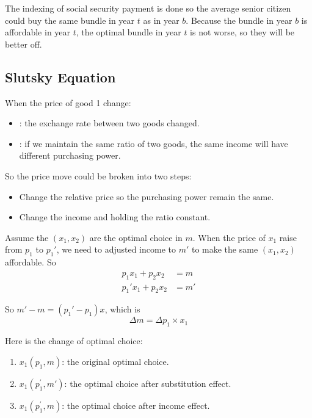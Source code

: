 \begin{example}
    The indexing of social security payment is done so the average senior citizen could buy the same bundle in year $t$ as in year $b$. Because the bundle in year $b$ is affordable in year $t$, the optimal bundle in year $t$ is not worse, so they will be better off.
\end{example}


\subsection{Slutsky Equation}

When the price of good 1 change:
\begin{itemize}
    \item {}: the exchange rate between two goods changed.
    \item {}: if we maintain the same ratio of two goods, the same income will have different purchasing power.
\end{itemize}

So the price move could be broken into two steps:
\begin{itemize}
    \item Change the relative price so the purchasing power remain the same.
    \item Change the income and holding the ratio constant.
\end{itemize}

Assume the $(x_1,x_2)$ are the optimal choice in $m$. When the price of $x_1$ raise from $p_1$ to ${p_1}'$, we need to adjusted income to $m'$ to make the same $(x_1,x_2)$ affordable. So
\begin{equation}
    \begin{aligned}
        p_1 x_1 + p_2 x_2 &= m \\
        {p_1}' x_1 + p_2 x_2 &= m'
    \end{aligned}
\end{equation}

So $m' - m = ({p_1}' - p_1)x$, which is 
\begin{equation}
    \Delta m = \Delta p_1 \times x_1
\end{equation}

Here is the change of optimal choice:
\begin{enumerate}
    \item $x_1(p_1,m)$: the original optimal choice.
    \item $x_1(p_1^{'}, m')$: the optimal choice after substitution effect.
    \item $x_1(p_1^{'},m)$: the optimal choice after income effect.
\end{enumerate}

